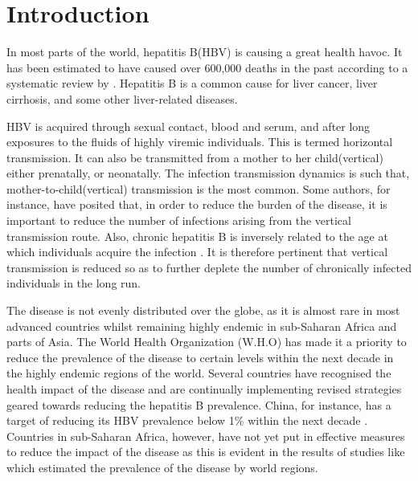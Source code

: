 \chapter{Introduction}
\label{chp:Intro}
In most parts of the world, hepatitis B(HBV) is causing a great health havoc. It has been estimated to have caused over 600,000 deaths in the past according to a systematic review by \cite{ott2012GlobalEpidemiology}. Hepatitis B is a common cause for liver cancer, liver cirrhosis, and some other liver-related diseases.  

HBV is acquired  through sexual contact, blood and serum, and after long exposures to the fluids of highly viremic individuals. This is termed horizontal transmission. It can also be transmitted from a mother to her child(vertical) either prenatally, or neonatally. The infection transmission dynamics is such that, mother-to-child(vertical) transmission is the most common\cite{tran2009management}. Some authors, for instance, \cite{tran2009management,andersson2015mother} have posited that, in order to reduce the burden of the disease, it is important to reduce the number of infections arising from the vertical transmission route. Also,  chronic hepatitis B is inversely related to the age at which individuals acquire the infection\cite{tran2009management} . It is therefore pertinent that vertical transmission is reduced so as to further deplete the number of chronically infected individuals in the long run. 

The disease is not evenly distributed over the globe, as it is almost rare in most advanced countries whilst remaining highly endemic in sub-Saharan Africa and parts of Asia\cite{medley2001hepatitis}. The World Health Organization (W.H.O) has made it a priority to reduce the prevalence of the disease to certain levels within the next decade in the highly endemic regions of the world. Several countries have recognised the health impact of the disease and are continually implementing revised strategies geared towards reducing the hepatitis B prevalence. China, for instance, has a target of reducing its HBV prevalence below 1\% within the next decade \cite{pang2010DynamicalBehaviour}. Countries in sub-Saharan Africa, however, have not yet put in effective measures to reduce the impact of the disease as this is evident in the results of studies like \cite{ott2012GlobalEpidemiology} which estimated the prevalence of the disease by world regions. 

